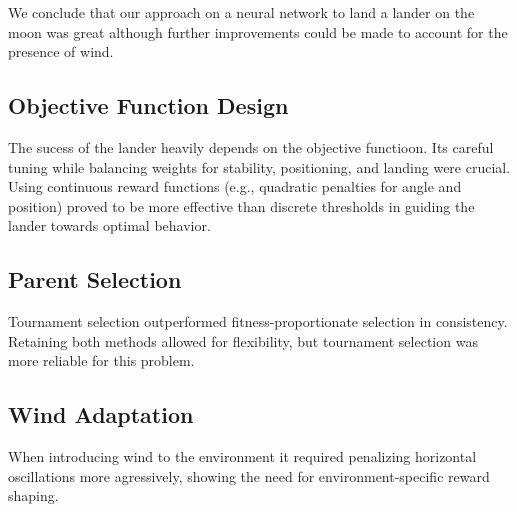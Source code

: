 \documentclass{article}
\begin{document}
We conclude that our approach on a neural network to land a lander on the moon was great although further improvements could be made to account for the presence of wind.


\subsection{Objective Function Design}

The sucess of the lander heavily depends on the objective functioon. Its careful tuning while balancing weights for stability, positioning, and landing were crucial.
Using continuous reward functions (e.g., quadratic penalties for angle and position) proved to be more effective than discrete thresholds in guiding the lander towards optimal behavior.

\subsection{Parent Selection}

Tournament selection outperformed fitness-proportionate selection in consistency. Retaining both methods allowed for flexibility, but tournament selection was more reliable for this problem.

\subsection{Wind Adaptation}
When introducing wind to the environment it required penalizing horizontal oscillations more agressively, showing the need for environment-specific reward shaping.
\end{document}
